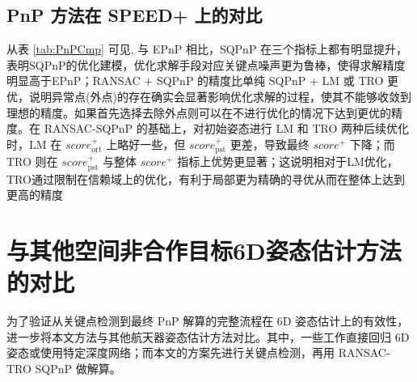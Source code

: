 \subsection{PnP 方法在 SPEED+ 上的对比}
\begin{table*}[!htbp]
	\centering
	\caption{在SPEED+合成数据集上的PnP算法对比}
	\label{tab:PnPCmp}
\end{table*}

从表 \ref{tab:PnPCmp} 可见, 与 EPnP 相比，SQPnP 在三个指标上都有明显提升，表明SQPnP的优化建模，优化求解手段对应关键点噪声更为鲁棒，使得求解精度明显高于EPnP；RANSAC + SQPnP 的精度比单纯 SQPnP + LM 或 TRO 更优，说明异常点(外点)的存在确实会显著影响优化求解的过程，使其不能够收敛到理想的精度。如果首先选择去除外点则可以在不进行优化的情况下达到更优的精度。在 RANSAC-SQPnP 的基础上，对初始姿态进行 LM 和 TRO 两种后续优化时，LM 在 $score_{\text{ort}}^+$ 上略好一些，但 $score_{\text{pst}}^+$ 更差，导致最终 $score^+$ 下降；而 TRO 则在 $score_{\text{pst}}^+$ 与整体 $score^+$ 指标上优势更显著；这说明相对于LM优化，TRO通过限制在信赖域上的优化，有利于局部更为精确的寻优从而在整体上达到更高的精度


\section{与其他空间非合作目标6D姿态估计方法的对比}
\label{sec:RANSAC-TRO-SQPnP:OthersCompare}
为了验证从关键点检测到最终 PnP 解算的完整流程在 6D 姿态估计上的有效性，进一步将本文方法与其他航天器姿态估计方法对比。其中，一些工作直接回归 6D 姿态或使用特定深度网络；而本文的方案先进行关键点检测，再用 RANSAC-TRO SQPnP 做解算。


